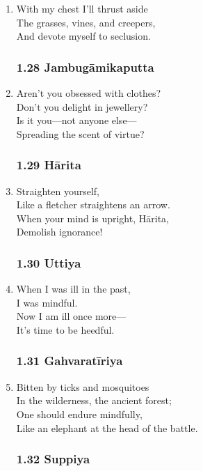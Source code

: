 \documentclass[10pt, openany]{book}
\begin{document}
\begin{enumerate}
\item With my chest I’ll thrust aside \\
The grasses, vines, and creepers,\\
And devote myself to seclusion.

\subsubsection*{1.28 Jambugāmikaputta}

\item Aren’t you obsessed with clothes?\\
Don’t you delight in jewellery?\\
Is it you—not anyone else—\\
Spreading the scent of virtue?

\subsubsection*{1.29 Hārita}

\item Straighten yourself,\\
Like a fletcher straightens an arrow.\\
When your mind is upright, Hārita, \\
Demolish ignorance!

\subsubsection*{1.30 Uttiya}

\item When I was ill in the past,\\
I was mindful.\\
Now I am ill once more—\\
It’s time to be heedful.

\subsubsection*{1.31 Gahvaratīriya}

\item Bitten by ticks and mosquitoes\\
In the wilderness, the ancient forest;\\
One should endure mindfully,\\
Like an elephant at the head of the battle.

\subsubsection*{1.32 Suppiya}


\end{enumerate}
\end{document}

